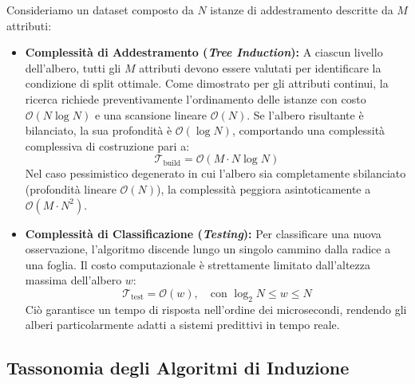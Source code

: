 Consideriamo un dataset composto da $N$ istanze di addestramento descritte da $M$ attributi:
\begin{itemize}
    \item \textbf{Complessit\`a di Addestramento (\textit{Tree Induction}):}
    A ciascun livello dell'albero, tutti gli $M$ attributi devono essere valutati per identificare la condizione di split ottimale. Come dimostrato per gli attributi continui, la ricerca richiede preventivamente l'ordinamento delle istanze con costo $\mathcal{O}(N \log N)$ e una scansione lineare $\mathcal{O}(N)$. Se l'albero risultante è bilanciato, la sua profondità è $\mathcal{O}(\log N)$, comportando una complessità complessiva di costruzione pari a:
    \begin{equation}
        \mathcal{T}_{\text{build}} = \mathcal{O}(M \cdot N \log N)
    \end{equation}
    Nel caso pessimistico degenerato in cui l'albero sia completamente sbilanciato (profondità lineare $\mathcal{O}(N)$), la complessità peggiora asintoticamente a $\mathcal{O}(M \cdot N^2)$.
    \item \textbf{Complessit\`a di Classificazione (\textit{Testing}):}
    Per classificare una nuova osservazione, l'algoritmo discende lungo un singolo cammino dalla radice a una foglia. Il costo computazionale è strettamente limitato dall'altezza massima dell'albero $w$:
    \begin{equation}
        \mathcal{T}_{\text{test}} = \mathcal{O}(w), \quad \text{con } \log_2 N \le w \le N
    \end{equation}
    Ciò garantisce un tempo di risposta nell'ordine dei microsecondi, rendendo gli alberi particolarmente adatti a sistemi predittivi in tempo reale.
\end{itemize}

\FloatBarrier
\subsection{Tassonomia degli Algoritmi di Induzione}
\label{subsec:dm-algorithms-comparison}


